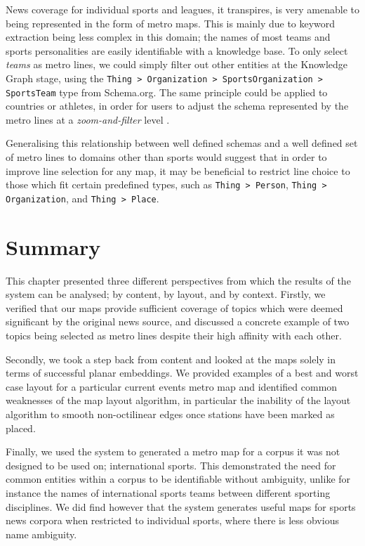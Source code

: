 News coverage for individual sports and leagues, it transpires, is very amenable to being represented in the form of metro maps. This is mainly due to keyword extraction being less complex in this domain; the names of most teams and sports personalities are easily identifiable with a knowledge base. To only select \textit{teams} as metro lines, we could simply filter out other entities at the Knowledge Graph stage, using the \texttt{Thing > Organization > SportsOrganization > SportsTeam} type from Schema.org. The same principle could be applied to countries or athletes, in order for users to adjust the schema represented by the metro lines at a \textit{zoom-and-filter} level \citep{TheEyesHaveIt}.

Generalising this relationship between well defined schemas and a well defined set of metro lines to domains other than sports would suggest that in order to improve line selection for any map, it may be beneficial to restrict line choice to those which fit certain predefined types, such as \texttt{Thing > Person}, \texttt{Thing > Organization}, and \texttt{Thing > Place}. 

\section{Summary}

This chapter presented three different perspectives from which the results of the system can be analysed; by content, by layout, and by context. Firstly, we verified that our maps provide sufficient coverage of topics which were deemed significant by the original news source, and discussed a concrete example of two topics being selected as metro lines despite their high affinity with each other.

Secondly, we took a step back from content and looked at the maps solely in terms of successful planar embeddings. We provided examples of a best and worst case layout for a particular current events metro map and identified common weaknesses of the map layout algorithm, in particular the inability of the layout algorithm to smooth non-octilinear edges once stations have been marked as placed.

Finally, we used the system to generated a metro map for a corpus it was not designed to be used on; international sports. This demonstrated the need for common entities within a corpus to be identifiable without ambiguity, unlike for instance the names of international sports teams between different sporting disciplines. We did find however that the system generates useful maps for sports news corpora when restricted to individual sports, where there is less obvious name ambiguity.

